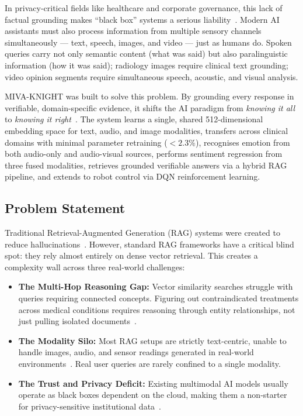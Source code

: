 \documentclass[12pt,a4paper]{article}
\theoremstyle{definition}
\theoremstyle{plain}
\theoremstyle{remark}
\begin{document}
In privacy-critical fields like healthcare and corporate governance, this lack of factual grounding makes ``black box'' systems a serious liability~\cite{pan2024unifying}. Modern AI assistants must also process information from multiple sensory channels simultaneously --- text, speech, images, and video --- just as humans do. Spoken queries carry not only semantic content (what was said) but also paralinguistic information (how it was said); radiology images require clinical text grounding; video opinion segments require simultaneous speech, acoustic, and visual analysis.

MIVA-KNIGHT was built to solve this problem. By grounding every response in verifiable, domain-specific evidence, it shifts the AI paradigm from \emph{knowing it all} to \emph{knowing it right}~\cite{sarmah2024hybridrag}. The system learns a single, shared 512-dimensional embedding space for text, audio, and image modalities, transfers across clinical domains with minimal parameter retraining ($< 2.3\%$), recognises emotion from both audio-only and audio-visual sources, performs sentiment regression from three fused modalities, retrieves grounded verifiable answers via a hybrid RAG pipeline, and extends to robot control via DQN reinforcement learning.

\subsection{Problem Statement}

Traditional Retrieval-Augmented Generation (RAG) systems were created to reduce hallucinations~\cite{lewis2020rag}. However, standard RAG frameworks have a critical blind spot: they rely almost entirely on dense vector retrieval. This creates a complexity wall across three real-world challenges:

\begin{itemize}[leftmargin=1.5em]
  \item \textbf{The Multi-Hop Reasoning Gap:} Vector similarity searches struggle with queries requiring connected concepts. Figuring out contraindicated treatments across medical conditions requires reasoning through entity relationships, not just pulling isolated documents~\cite{sarmah2024hybridrag}.

  \item \textbf{The Modality Silo:} Most RAG setups are strictly text-centric, unable to handle images, audio, and sensor readings generated in real-world environments~\cite{kadam2022multimodal}. Real user queries are rarely confined to a single modality.

  \item \textbf{The Trust and Privacy Deficit:} Existing multimodal AI models usually operate as black boxes dependent on the cloud, making them a non-starter for privacy-sensitive institutional data~\cite{pan2024unifying}.
\end{itemize}
\end{document}
